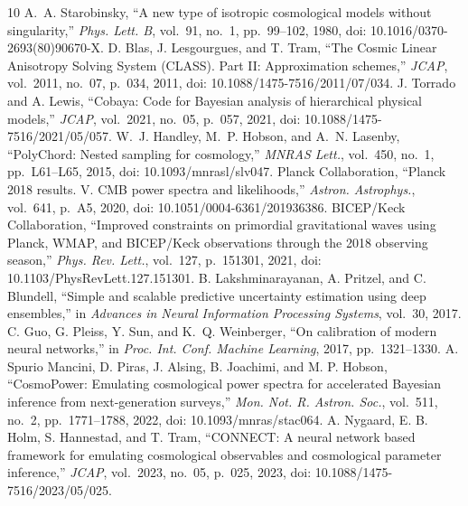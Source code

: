 \documentclass[a4paper,conference,10pt]{IEEEtran}
\begin{document}
\clearpage
\begin{thebibliography}{10}
 A.~A. Starobinsky, ``A new type of isotropic cosmological models without singularity,'' \emph{Phys. Lett. B}, vol.~91, no.~1, pp.~99--102, 1980, doi: 10.1016/0370-2693(80)90670-X.
 D. Blas, J. Lesgourgues, and T. Tram, ``The Cosmic Linear Anisotropy Solving System (CLASS). Part II: Approximation schemes,'' \emph{JCAP}, vol.~2011, no.~07, p.~034, 2011, doi: 10.1088/1475-7516/2011/07/034.
 J. Torrado and A. Lewis, ``Cobaya: Code for Bayesian analysis of hierarchical physical models,'' \emph{JCAP}, vol.~2021, no.~05, p.~057, 2021, doi: 10.1088/1475-7516/2021/05/057.
 W.~J. Handley, M.~P. Hobson, and A.~N. Lasenby, ``PolyChord: Nested sampling for cosmology,'' \emph{MNRAS Lett.}, vol.~450, no.~1, pp.~L61--L65, 2015, doi: 10.1093/mnrasl/slv047.
 Planck Collaboration, ``Planck 2018 results. V. CMB power spectra and likelihoods,'' \emph{Astron. Astrophys.}, vol.~641, p.~A5, 2020, doi: 10.1051/0004-6361/201936386.
 BICEP/Keck Collaboration, ``Improved constraints on primordial gravitational waves using Planck, WMAP, and BICEP/Keck observations through the 2018 observing season,'' \emph{Phys. Rev. Lett.}, vol.~127, p.~151301, 2021, doi: 10.1103/PhysRevLett.127.151301.
 B. Lakshminarayanan, A. Pritzel, and C. Blundell, ``Simple and scalable predictive uncertainty estimation using deep ensembles,'' in \emph{Advances in Neural Information Processing Systems}, vol.~30, 2017.
 C. Guo, G. Pleiss, Y. Sun, and K.~Q. Weinberger, ``On calibration of modern neural networks,'' in \emph{Proc. Int. Conf. Machine Learning}, 2017, pp.~1321--1330.
 A. Spurio Mancini, D. Piras, J. Alsing, B. Joachimi, and M. P. Hobson, ``CosmoPower: Emulating cosmological power spectra for accelerated Bayesian inference from next-generation surveys,'' \emph{Mon. Not. R. Astron. Soc.}, vol.~511, no.~2, pp.~1771--1788, 2022, doi: 10.1093/mnras/stac064.
 A. Nygaard, E. B. Holm, S. Hannestad, and T. Tram, ``CONNECT: A neural network based framework for emulating cosmological observables and cosmological parameter inference,'' \emph{JCAP}, vol.~2023, no.~05, p.~025, 2023, doi: 10.1088/1475-7516/2023/05/025.
\end{thebibliography}
\end{document}
